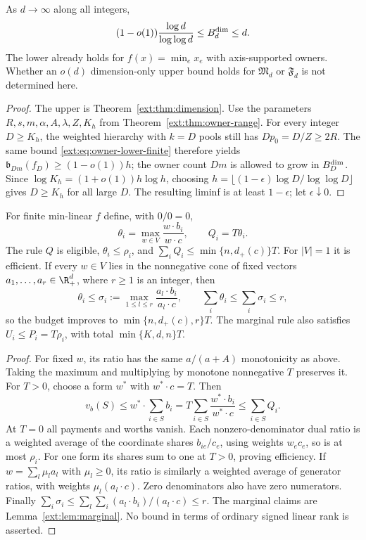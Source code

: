 \begin{theorem}\label{ext:thm:dim-gap}
As $d\to\infty$ along all integers,
\[
 (1-o(1))\frac{\log d}{\log\log d}\le B_d^{\rm dim}\le d.
\]
The lower already holds for $f(x)=\min_ex_e$ with axis-supported owners.
Whether an $o(d)$ dimension-only upper bound holds for $\mathfrak M_d$ or
$\mathfrak F_d$ is not determined here.
\end{theorem}
\begin{proof}
The upper is Theorem~\ref{ext:thm:dimension}.
Use the parameters $R,s,m,\alpha,A,\lambda,Z,K_h$ from
Theorem~\ref{ext:thm:owner-range}.  For every integer $D\ge K_h$, the weighted
hierarchy with $k=D$ pools still has $Dp_0=D/Z\ge2R$.
The same bound \eqref{ext:eq:owner-lower-finite} therefore yields
$\mathfrak b_{Dm}(f_D)\ge(1-o(1))h$; the owner count $Dm$ is allowed to grow
in $B_D^{\rm dim}$.  Since $\log K_h=(1+o(1))h\log h$, choosing
$h=\lfloor(1-\epsilon)\log D/\log\log D\rfloor$ gives $D\ge K_h$ for all
large $D$.  The resulting liminf is at least $1-\epsilon$;
let $\epsilon\downarrow0$.
\end{proof}

\begin{proposition}\label{ext:prop:dual-share}
For finite min-linear $f$ define, with $0/0=0$,
\[
 \theta_i=\max_{w\in V}\frac{w\cdot b_i}{w\cdot c},\qquad Q_i=T\theta_i.
\]
The rule $Q$ is eligible, $\theta_i\le\rho_i$, and
$\sum_iQ_i\le\min\{n,d_+(c)\}T$.  For $|V|=1$ it is efficient.
If every $w\in V$ lies in the nonnegative cone of fixed vectors
$a_1,\ldots,a_r\in\R_+^d$, where $r\ge1$ is an integer, then
\[
 \theta_i\le\sigma_i:=\max_{1\le l\le r}\frac{a_l\cdot b_i}{a_l\cdot c},
 \qquad\sum_i\theta_i\le\sum_i\sigma_i\le r,
\]
so the budget improves to $\min\{n,d_+(c),r\}T$.
The marginal rule also satisfies $U_i\le P_i=T\rho_i$, with total
$\min\{K,d,n\}T$.
\end{proposition}
\begin{proof}
For fixed $w$, its ratio has the same $a/(a+A)$ monotonicity as above.
Taking the maximum and multiplying by monotone nonnegative $T$ preserves it.
For $T>0$, choose a form $w^*$ with $w^*\cdot c=T$.  Then
\[
 v_b(S)\le w^*\cdot\sum_{i\in S}b_i
     =T\sum_{i\in S}\frac{w^*\cdot b_i}{w^*\cdot c}
     \le\sum_{i\in S}Q_i.
\]
At $T=0$ all payments and worths vanish.
Each nonzero-denominator dual ratio is a weighted average of the coordinate
shares $b_{ie}/c_e$, using weights $w_ec_e$, so is at most $\rho_i$.
For one form its shares sum to one at $T>0$, proving efficiency.
If $w=\sum_l\mu_la_l$ with $\mu_l\ge0$, its ratio is similarly a weighted
average of generator ratios, with weights $\mu_l(a_l\cdot c)$.
Zero denominators also have zero numerators.  Finally
$\sum_i\sigma_i\le\sum_l\sum_i(a_l\cdot b_i)/(a_l\cdot c)\le r$.
The marginal claims are Lemma~\ref{ext:lem:marginal}.
No bound in terms of ordinary signed linear rank is asserted.
\end{proof}

